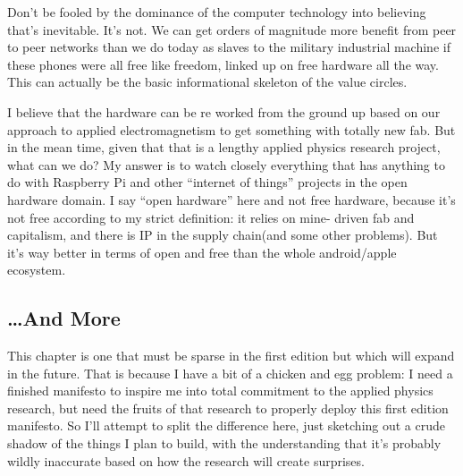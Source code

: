 Don't be fooled by the dominance of the computer technology into
believing that's inevitable. It's not. We can get orders of magnitude
more benefit from peer to peer networks than we do today as slaves to
the military industrial machine if these phones were all free like
freedom, linked up on free hardware all the way. This can actually be
the basic informational skeleton of the value circles.

I believe that the hardware can be re worked from the ground up based on
our approach to applied electromagnetism to get something with totally
new fab. But in the mean time, given that that is a lengthy applied
physics research project, what can we do? My answer is to watch closely
everything that has anything to do with Raspberry Pi and other
``internet of things'' projects in the open hardware domain. I say
``open hardware'' here and not free hardware, because it's not free
according to my strict definition: it relies on mine- driven fab and
capitalism, and there is IP in the supply chain(and some other
problems). But it's way better in terms of open and free than the whole
android/apple ecosystem.

\subsection{\ldots{}And More}\label{and-more}

This chapter is one that must be sparse in the first edition but which
will expand in the future. That is because I have a bit of a chicken and
egg problem: I need a finished manifesto to inspire me into total
commitment to the applied physics research, but need the fruits of that
research to properly deploy this first edition manifesto. So I'll
attempt to split the difference here, just sketching out a crude shadow
of the things I plan to build, with the understanding that it's probably
wildly inaccurate based on how the research will create surprises.
